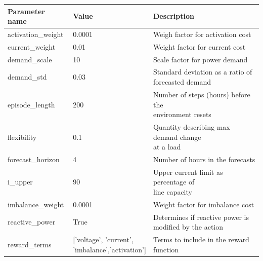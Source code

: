 \documentclass[class=book, crop=false]{standalone}
\begin{document}
{
\renewcommand{\arraystretch}{1.5}
\begin{table}[ht]
\center
\begin{tabular}{lll}
Parameter name     & Value                                                & Description                                                  \\
\hline
activation\_weight & 0.0001                                               & Weigh factor for activation cost                             \\
current\_weight    & 0.01                                                 & Weight factor for current cost                               \\
demand\_scale      & 10                                                   & Scale factor for power demand                                \\
demand\_std        & 0.03                                                 & \makecell[l]{Standard deviation as a ratio of \\ forecasted demand}           \\
episode\_length    & 200                                                  & \makecell[l]{Number of steps (hours) before the \\ environment resets}        \\
flexibility        & 0.1                                                  & \makecell[l]{Quantity describing  max demand change \\ at a load}              \\
forecast\_horizon  & 4                                                    & Number of hours in the forecasts                             \\
i\_upper           & 90                                                   & \makecell[l]{Upper current limit as percentage of \\line capacity}            \\
imbalance\_weight  & 0.0001                                               & Weight factor for imbalance cost                             \\
reactive\_power    & True                                                 & \makecell[l]{Determines if reactive power is \\ modified by the action}       \\
reward\_terms      & \makecell[l]{{[}’voltage’, ’current’,\\ ’imbalance’,’activation’{]}} & Terms to include in the reward function                      \\

\end{tabular}
\end{table}}
\end{document}
